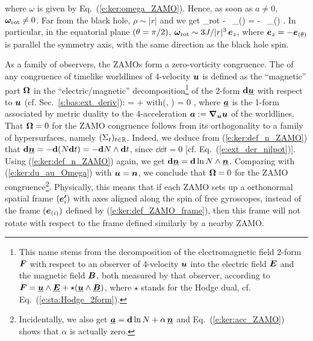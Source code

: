 \ee
where $\omega$ is given by Eq.~(\ref{e:ker:omega_ZAMO}).
Hence, as soon as $a\neq 0$, $\bm{\omega}_{\rm rot} \neq 0$.
Far from the black hole, $\rho\sim |r|$ and we get
\be \label{e:ker:rot_ZAMO_asymp}
     \w{\omega}_{\rm rot} 
     -   \sin\th \, _{(\th)}
     = -  \sin\th \, _{(\th)} .
\ee
In particular, in the equatorial plane $(\theta=\pi/2)$, $\bm{\omega}_{\rm rot} \sim 3 J/|r|^3 \, \bm{e}_z$,
where $\bm{e}_z = - \bm{e}_{(\theta)}$ is parallel the symmetry axis, with the same direction as
the black hole spin.

\begin{remark}
As a family of observers, the ZAMOs form a zero-vorticity congruence.
The  of any congruence of timelike worldlines of
4-velocity $\bm{u}$ is defined as the ``magnetic'' part $\bm{\Omega}$ in the ``electric/magnetic''
decomposition\footnote{This name stems from the decomposition of the electromagnetic field 2-form $\bm{F}$
with respect to an observer of 4-velocity $\bm{u}$ into the electric field $\bm{E}$ and the magnetic
field $\bm{B}$, both measured by that observer, according to
$\bm{F} = \underline{\bm{u}}\wedge\underline{\bm{E}} + \star (\underline{\bm{u}}\wedge\underline{\bm{B}})$, where $\star$ stands
for the Hodge dual, cf. Eq.~(\ref{e:sta:Hodge_2form}).}
of the 2-form $\mathbf{d}\underline{\bm{u}}$ with respect to $\bm{u}$ (cf. Sec.~\ref{s:bas:ext_deriv}):
\be \label{e:ker:du_au_Omega}
    \dd{} = \wedge {} + \w{\Omega} \quad\mbox{with}\quad \w{\Omega}(, \cdot) = 0 ,
\ee
where $\underline{\bm{a}}$ is the 1-form associated by metric duality to the 4-acceleration $\bm{a} := \bm{\nabla}_{\bm{u}} \bm{u}$
of the worldlines. That $\bm{\Omega} = 0$ for the ZAMO congruence follows from
its orthogonality to a family of hypersurfaces, namely $(\Sigma_t)_{t\in\mathbb{R}}$.
Indeed, we deduce from (\ref{e:ker:def_n_ZAMO}) that $\mathbf{d} \underline{\bm{n}} = - \mathbf{d}(N \mathbf{d} t) = - \mathbf{d} N \wedge \mathbf{d} t$,
since $\dd \dd t = 0$ [cf. Eq.~(\ref{e:ext_der_nilpot})]. Using (\ref{e:ker:def_n_ZAMO}) again, we
get $\mathbf{d} \underline{\bm{n}} = \mathbf{d} \ln N \wedge \underline{\bm{n}}$. Comparing with (\ref{e:ker:du_au_Omega}) with $\bm{u} = \bm{n}$, we conclude that
$\bm{\Omega} = 0$ for the ZAMO congruence\footnote{Incidentally, we also get $\underline{\bm{a}} = \mathbf{d} \ln N + \alpha \, \underline{\bm{n}}$
and Eq.~(\ref{e:ker:acc_ZAMO}) shows that $\alpha$ is actually zero.}.
Physically, this means that if each ZAMO sets up a orthonormal spatial frame $(\bm{e'}_i)$ with axes aligned along
the spin of free gyroscopes, instead of the frame $(\bm{e}_{(i)})$ defined by
(\ref{e:ker:def_ZAMO_frame}), then this frame will not rotate with respect to the frame defined
similarly by a nearby ZAMO.
\end{remark}

